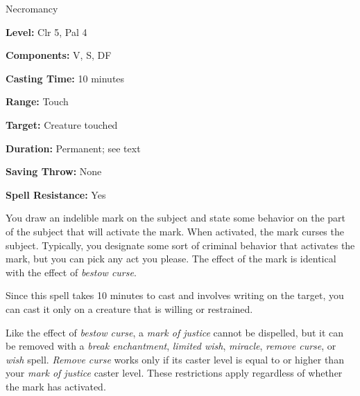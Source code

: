 
Necromancy

\textbf{Level:} Clr 5, Pal 4

\textbf{Components:} V, S, DF

\textbf{Casting Time:} 10 minutes

\textbf{Range:} Touch

\textbf{Target:} Creature touched

\textbf{Duration:} Permanent; see text

\textbf{Saving Throw:} None

\textbf{Spell Resistance:} Yes

You draw an indelible mark on the subject and state some behavior on the part of 
the subject that will activate the mark. When activated, the mark curses the subject. 
Typically, you designate some sort of criminal behavior that activates the mark, 
but you can pick any act you please. The effect of the mark is identical with the 
effect of \textit{bestow curse}.

Since this spell takes 10 minutes to cast and involves writing on the target, you 
can cast it only on a creature that is willing or restrained.

Like the effect of \textit{bestow curse}, a \textit{mark of justice} cannot be 
dispelled, but it can be removed with a \textit{break enchantment}, \textit{limited 
wish}, \textit{miracle}, \textit{remove curse}, or \textit{wish} spell. \textit{Remove 
curse} works only if its caster level is equal to or higher than your \textit{mark 
of justice} caster level. These restrictions apply regardless of whether the mark 
has activated.

